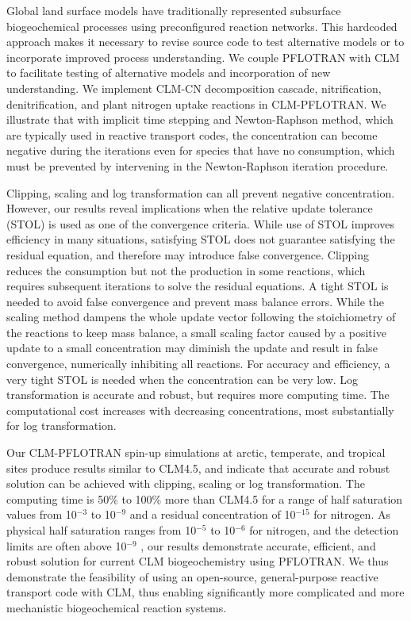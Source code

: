 \documentclass[gmd, manuscript]{copernicus}
\begin{document}
%
Global land surface models have traditionally represented subsurface biogeochemical processes using preconfigured reaction networks. This hardcoded approach makes it necessary to revise source code to test alternative models or to incorporate improved process understanding. We couple PFLOTRAN with CLM to facilitate testing of alternative models and incorporation of new understanding. We implement CLM-CN decomposition cascade, nitrification, denitrification, and plant nitrogen uptake reactions in CLM-PFLOTRAN. We illustrate that with implicit time stepping and Newton-Raphson method, which are typically used in reactive transport codes, the concentration can become negative during the iterations even for species that have no consumption, which must be prevented by intervening in the Newton-Raphson iteration procedure. 

Clipping, scaling  and log transformation can all prevent
negative concentration. However, our results reveal implications when the relative update tolerance (STOL) is used as one of the convergence criteria. 
While use of STOL improves efficiency in many situations, satisfying STOL does not guarantee satisfying the residual equation, and therefore may introduce false convergence.
Clipping reduces the consumption but not the production in some reactions, which requires subsequent iterations to solve the residual equations. A tight STOL is needed to avoid false convergence and prevent mass balance errors. While the scaling method dampens the whole update vector following the stoichiometry of the reactions to keep mass balance, a small scaling factor caused by a positive update to a small concentration may diminish the update and result in false convergence, numerically inhibiting all reactions. For accuracy and efficiency, a very tight STOL is needed when the concentration can be very low.
Log transformation is accurate and robust, but requires more computing time. The computational cost increases with decreasing concentrations, most substantially for log transformation.

Our CLM-PFLOTRAN spin-up simulations at arctic, temperate, and tropical sites produce results similar to CLM4.5, 
and indicate that accurate and robust solution can be achieved with clipping, scaling or log
transformation. The computing time is 50\% to 100\% more than CLM4.5 for a range of half
saturation values from 10$^{-3}$ to 10$^{-9}$ and a residual concentration of
10$^{-15}$ for nitrogen. As physical half
saturation ranges from 10$^{-5}$ to 10$^{-6}$  for nitrogen, and the
detection limits are often above 10$^{-9}$ , our results demonstrate accurate, efficient, and robust solution
 for current CLM biogeochemistry using PFLOTRAN. We thus demonstrate the feasibility of using an open-source, general-purpose reactive transport code with CLM, thus enabling significantly more complicated and more mechanistic biogeochemical reaction systems. 
 
\end{document}
